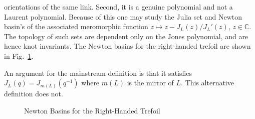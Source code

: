         orientations of the same link. Second, it is a genuine polynomial and
        not a Laurent polynomial. Because of this one may study the Julia set
        and Newton basin's of the associated meromorphic function
        $z\mapsto{z}-J_{L}(z)/J_{L}'(z)$, $z\in\mathbb{C}$. The topology of
        such sets are dependent only on the Jones polynomial, and
        are hence knot invariants. The Newton basins for the right-handed
        trefoil are shown in
        Fig.~\ref{fig:newton_fractal_right_trefoil_jones}.
        \par\hfill\par
        An argument for the mainstream definition is that it satisfies
        $J_{L}(q)=J_{m(L)}(q^{-1})$ where $m(L)$ is the mirror of $L$. This
        alternative definition does not.
        \begin{figure}
            \centering
            \caption{Newton Basins for the Right-Handed Trefoil}
            \label{fig:newton_fractal_right_trefoil_jones}
        \end{figure}
